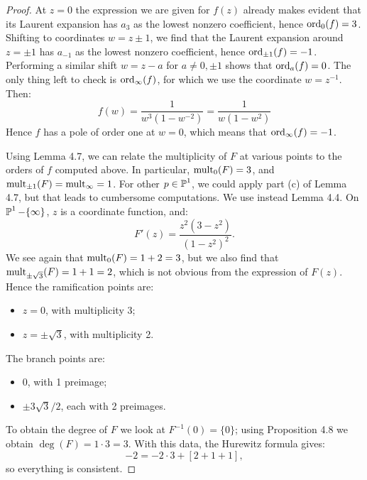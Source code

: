 \documentclass{article}
\begin{document}
\begin{proof}
At $z=0$ the expression we are given for $f(z)$ already makes evident that its Laurent expansion has
$a_3$ as the lowest nonzero coefficient, hence $\operatorname{ord}_0(f) = 3$. Shifting to coordinates $w = z \pm 1$, we
find that the Laurent expansion around $z = \pm 1$ has $a_{-1}$ as the lowest nonzero coefficient,
hence $\operatorname{ord}_{\pm 1}(f) = -1$. Performing a similar shift $w = z - a$ for $a \neq 0, \pm 1$ shows that
$\operatorname{ord}_{a}(f) = 0$. The only thing left to check is $\operatorname{ord}_{\infty}(f)$, for which we use the coordinate
$w = z^{-1}$. Then:
\[	f(w) = \frac{1}{w^3(1-w^{-2})} = \frac{1}{w(1-w^2)}	\]
Hence $f$ has a pole of order one at $w=0$, which means that $\operatorname{ord}_{\infty}(f) = -1$.

Using Lemma 4.7, we can relate the multiplicity of $F$ at various points to the orders of $f$ computed
above. In particular, $\operatorname{mult}_0(F) = 3$, and $\operatorname{mult}_{\pm 1}(F) = \operatorname{mult}_{\infty} = 1$. For other
$p \in \operatorname{\mathbb{P}}^1$, we could apply part (c) of Lemma 4.7, but that leads to cumbersome computations. We use
instead Lemma 4.4. On $\operatorname{\mathbb{P}}^1 - \{\infty\}$, $z$ is a coordinate function, and:
\[	F'(z) = \frac{z^2(3-z^2)}{(1-z^2)^2}.	\]
We see again that $\operatorname{mult}_0(F) = 1+2 = 3$, but we also find that $\operatorname{mult}_{\pm\sqrt{3}}(F) = 1+1=2$,
which is not obvious from the expression of $F(z)$. Hence the ramification points are:
\begin{itemize}
\item $z=0$, with multiplicity 3;
\item $z= \pm \sqrt{3}$, with multiplicity 2.
\end{itemize}
The branch points are:
\begin{itemize}
\item 0, with 1 preimage;
\item $\pm 3\sqrt{3}/2$, each with 2 preimages.
\end{itemize}
To obtain the degree of $F$ we look at $F^{-1}(0) = \{0\}$; using Proposition 4.8 we obtain 
$\deg (F) = 1\cdot 3 = 3$. With this data, the Hurewitz formula gives:
\[	-2 = -2 \cdot 3 + [2+1+1],	\]
so everything is consistent.
\end{proof}
\end{document}
